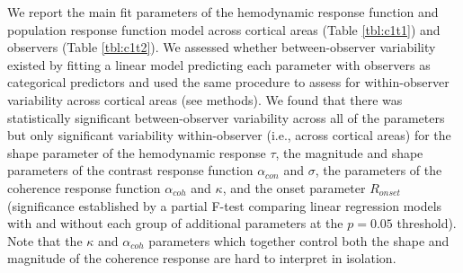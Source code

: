 \documentclass{report}
\begin{document}
We report the main fit parameters of the hemodynamic response function and population response function model across cortical areas (Table \ref{tbl:c1t1}) and observers (Table \ref{tbl:c1t2}). We assessed whether between-observer variability existed by fitting a linear model predicting each parameter with observers as categorical predictors and used the same procedure to assess for within-observer variability across cortical areas (see methods). We found that there was statistically significant between-observer variability across all of the parameters but only significant variability within-observer (i.e., across cortical areas) for the shape parameter of the hemodynamic response $\tau$, the magnitude and shape parameters of the contrast response function $\alpha_{con}$ and $\sigma$, the parameters of the coherence response function $\alpha_{coh}$ and $\kappa$, and the onset parameter $R_{onset}$ (significance established by a partial F-test comparing linear regression models with and without each group of additional parameters at the $p = 0.05$ threshold). Note that the $\kappa$ and $\alpha_{coh}$ parameters which together control both the shape and magnitude of the coherence response are hard to interpret in isolation.
\end{document}
